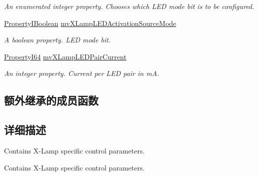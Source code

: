 \begin{DoxyCompactItemize}
\begin{DoxyCompactList}\small\item\em An enumerated integer property. Chooses which L\+E\+D mode bit is to be configured. \end{DoxyCompactList}\item 
\hyperlink{group___common_interface_ga44f9437e24b21b6c93da9039ec6786aa}{Property\+I\+Boolean} \hyperlink{classmv_i_m_p_a_c_t_1_1acquire_1_1_gen_i_cam_1_1mv_x_lamp_control_adb271d278c08f414bcbf20ea53f72575}{mv\+X\+Lamp\+L\+E\+D\+Activation\+Source\+Mode}
\begin{DoxyCompactList}\small\item\em A boolean property. L\+E\+D mode bit. \end{DoxyCompactList}\item 
\hyperlink{group___common_interface_ga81749b2696755513663492664a18a893}{Property\+I64} \hyperlink{classmv_i_m_p_a_c_t_1_1acquire_1_1_gen_i_cam_1_1mv_x_lamp_control_a46b609a67ee31dee4d3eec62f45eecee}{mv\+X\+Lamp\+L\+E\+D\+Pair\+Current}
\begin{DoxyCompactList}\small\item\em An integer property. Current per L\+E\+D pair in m\+A. \end{DoxyCompactList}\end{DoxyCompactItemize}
\subsection*{额外继承的成员函数}


\subsection{详细描述}
Contains X-\/\+Lamp specific control parameters. 

Contains X-\/\+Lamp specific control parameters. 

